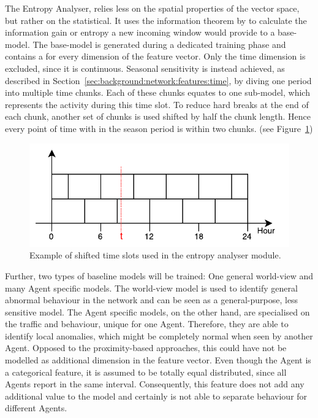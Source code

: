 The Entropy Analyser, relies less on the spatial properties of the vector space, but rather on the statistical.
It uses the information theorem by \textcite{Shannon1948} to calculate the information gain or entropy a new incoming window would provide to a base-model.
The base-model is generated during a dedicated training phase and contains a  for every dimension of the feature vector. Only the time dimension is excluded, since it is continuous.
Seasonal sensitivity is instead achieved, as described in Section~\ref{sec:background:network:features:time}, by diving one period into multiple time chunks. Each of these chunks equates to one sub-model, which represents the activity during this time slot. To reduce hard breaks at the end of each chunk, another set of chunks is used shifted by half the chunk length. Hence every point of time with in the season period is within two chunks. (see Figure~\ref{fig:concept:time-slots})

\begin{figure}[h]
	\centering
	\includegraphics[]{figures/300-time-slots.pdf}
	\caption{Example of shifted time slots used in the entropy analyser module.}
	\label{fig:concept:time-slots}
\end{figure}

\newpage
Further, two types of baseline models will be trained: One general world-view and many Agent specific models.
The world-view model is used to identify general abnormal behaviour in the network and can be seen as a general-purpose, less sensitive model.
The Agent specific models, on the other hand, are specialised on the traffic and behaviour, unique for one Agent. Therefore, they are able to identify local anomalies, which might be completely normal when seen by another Agent.
Opposed to the proximity-based approaches, this could have not be modelled as additional dimension in the feature vector.
Even though the Agent is a categorical feature, it is assumed to be totally equal distributed, since all Agents report in the same interval.
Consequently, this feature does not add any additional value to the model and certainly is not able to separate behaviour for different Agents.

